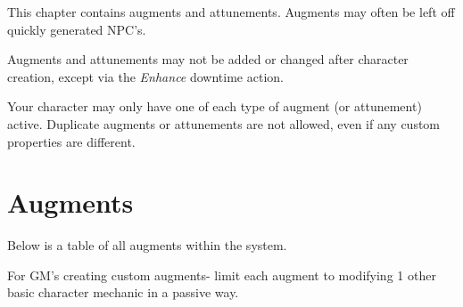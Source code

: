 \label{chap:augments}

This chapter contains augments and attunements. Augments may often be left off quickly generated NPC's.

Augments and attunements may not be added or changed after character creation, except via the \emph{Enhance} downtime action.

Your character may only have one of each type of augment (or attunement) active. Duplicate augments or attunements are not allowed, even if any custom properties are different.

\section{Augments}

Below is a table of all augments within the system.

For GM's creating custom augments- limit each augment to modifying 1 other basic character mechanic in a passive way.

